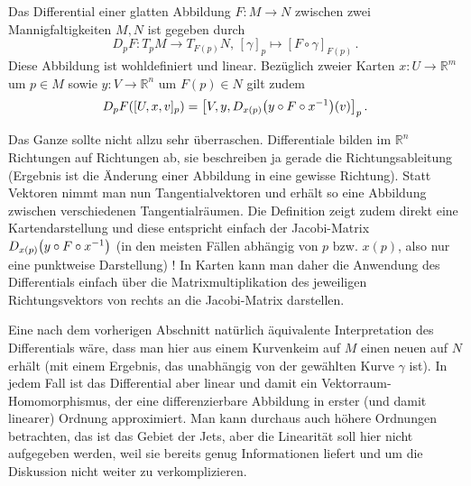 \documentclass[../H_Analysis_main.tex]{subfiles}
\begin{document}
\begin{satz}[Differential]
Das Differential einer glatten Abbildung $F: M \rightarrow N$ zwischen zwei Mannigfaltigkeiten $M, N$ ist gegeben durch
\begin{equation}
D_p F: T_p M \rightarrow T_{F(p)} N, \, [\gamma]_p \mapsto [F \circ \gamma]_{F(p)} \, .
\end{equation}
Diese Abbildung ist wohldefiniert und linear. Bezüglich zweier Karten $x: U \rightarrow \mathbb{R}^m$ um $p \in M$ sowie $y: V \rightarrow \mathbb{R}^n$ um $F(p) \in N$ gilt zudem
\begin{equation}
D_p F\qty([U, x, v]_p) = \qty[V, y, D_{x(p)} \qty(y \circ F \circ x^{-1})(v)]_p \, .
\end{equation}
\end{satz}
Das Ganze sollte nicht allzu sehr überraschen. Differentiale bilden im $\mathbb{R}^n$ Richtungen auf Richtungen ab, sie beschreiben ja gerade die Richtungsableitung (Ergebnis ist die Änderung einer Abbildung in eine gewisse Richtung). Statt Vektoren nimmt man nun Tangentialvektoren und erhält so eine Abbildung zwischen verschiedenen Tangentialräumen. Die Definition zeigt zudem direkt eine Kartendarstellung und diese entspricht einfach der Jacobi-Matrix $D_{x(p)} \qty(y \circ F \circ x^{-1})$ (in den meisten Fällen abhängig von $p$ bzw. $x(p)$, also nur eine punktweise Darstellung) ! In Karten kann man daher die Anwendung des Differentials einfach über die Matrixmultiplikation des jeweiligen Richtungsvektors von rechts an die Jacobi-Matrix darstellen.


Eine nach dem vorherigen Abschnitt natürlich äquivalente Interpretation des Differentials wäre, dass man hier aus einem Kurvenkeim auf $M$ einen neuen auf $N$ erhält (mit einem Ergebnis, das unabhängig von der gewählten Kurve $\gamma$ ist). In jedem Fall ist das Differential aber linear und damit ein Vektorraum-Homomorphismus, der eine differenzierbare Abbildung in erster (und damit linearer) Ordnung approximiert. Man kann durchaus auch höhere Ordnungen betrachten, das ist das Gebiet der Jets, aber die Linearität soll hier nicht aufgegeben werden, weil sie bereits genug Informationen liefert und um die Diskussion nicht weiter zu verkomplizieren.
\end{document}
